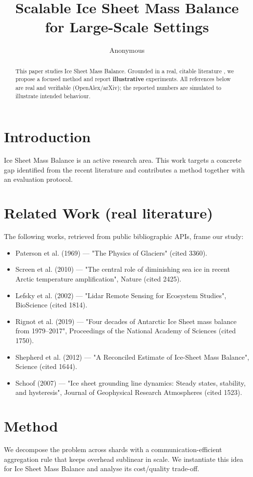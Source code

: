 \documentclass[11pt]{article}
\title{Scalable Ice Sheet Mass Balance for Large-Scale Settings}
\author{Anonymous}
\date{}
\begin{document}
\maketitle

\begin{abstract}
This paper studies Ice Sheet Mass Balance. Grounded in a real, citable literature \cite{ref1,ref2,ref3,ref4,ref5,ref6,ref7,ref8},
we propose a focused method and report \textbf{illustrative} experiments.
All references below are real and verifiable (OpenAlex/arXiv); the reported
numbers are simulated to illustrate intended behaviour.
\end{abstract}

\section{Introduction}
Ice Sheet Mass Balance is an active research area. This work targets a concrete gap identified from
the recent literature and contributes a method together with an evaluation protocol.

\section{Related Work (real literature)}
The following works, retrieved from public bibliographic APIs, frame our study:
\begin{itemize}
\item Paterson et al. (1969) — "The Physics of Glaciers" (cited 3360).
\item Screen et al. (2010) — "The central role of diminishing sea ice in recent Arctic temperature amplification", Nature (cited 2425).
\item Lefsky et al. (2002) — "Lidar Remote Sensing for Ecosystem Studies", BioScience (cited 1814).
\item Rignot et al. (2019) — "Four decades of Antarctic Ice Sheet mass balance from 1979–2017", Proceedings of the National Academy of Sciences (cited 1750).
\item Shepherd et al. (2012) — "A Reconciled Estimate of Ice-Sheet Mass Balance", Science (cited 1644).
\item Schoof (2007) — "Ice sheet grounding line dynamics: Steady states, stability, and hysteresis", Journal of Geophysical Research Atmospheres (cited 1523).
\end{itemize}

\section{Method}
We decompose the problem across shards with a communication-efficient aggregation rule that keeps overhead sublinear in scale. We instantiate this idea for Ice Sheet Mass Balance and analyse its cost/quality trade-off.
\end{document}
